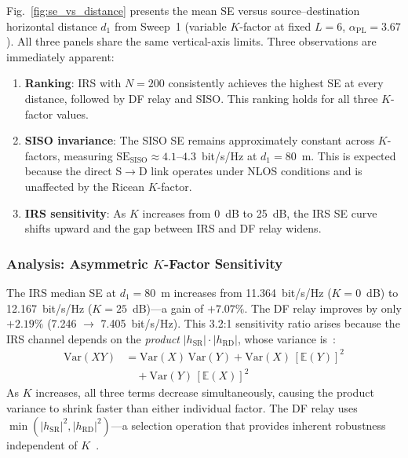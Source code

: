 \documentclass[journal]{IEEEtran} %
\begin{document}
Fig.~\ref{fig:se_vs_distance} presents the mean SE versus source--destination horizontal distance $d_1$ from Sweep~1 (variable $K$-factor at fixed $L = 6$, $\alpha_{\mathrm{PL}} = 3.67$). All three panels share the same vertical-axis limits. Three observations are immediately apparent:

\begin{enumerate}
    \item \textbf{Ranking}: IRS with $N = 200$ consistently achieves the highest SE at every distance, followed by DF relay and SISO. This ranking holds for all three $K$-factor values.

    \item \textbf{SISO invariance}: The SISO SE remains approximately constant across $K$-factors, measuring $\mathrm{SE}_{\mathrm{SISO}} \approx 4.1$--$4.3$~bit/s/Hz at $d_1 = 80$~m. This is expected because the direct S$\to$D link operates under NLOS conditions and is unaffected by the Ricean $K$-factor.

    \item \textbf{IRS sensitivity}: As $K$ increases from 0~dB to 25~dB, the IRS SE curve shifts upward and the gap between IRS and DF relay widens.
\end{enumerate}

\subsubsection{Analysis: Asymmetric $K$-Factor Sensitivity}

The IRS median SE at $d_1 = 80$~m increases from 11.364~bit/s/Hz ($K = 0$~dB) to 12.167~bit/s/Hz ($K = 25$~dB)---a gain of $+7.07\%$. The DF relay improves by only $+2.19\%$ (7.246 $\to$ 7.405~bit/s/Hz). This 3.2:1 sensitivity ratio arises because the IRS channel depends on the \textit{product} $|h_{\mathrm{SR}}| \cdot |h_{\mathrm{RD}}|$, whose variance is~\cite{simon2005digital}:
\begin{align}
    \mathrm{Var}(XY) &= \mathrm{Var}(X)\,\mathrm{Var}(Y) + \mathrm{Var}(X)\,[\mathbb{E}(Y)]^2 \nonumber \\
    &\quad+ \mathrm{Var}(Y)\,[\mathbb{E}(X)]^2
    \label{eq:product_variance}
\end{align}
As $K$ increases, all three terms decrease simultaneously, causing the product variance to shrink faster than either individual factor. The DF relay uses $\min(|h_{\mathrm{SR}}|^2, |h_{\mathrm{RD}}|^2)$---a selection operation that provides inherent robustness independent of $K$~\cite{hasna2003relay,laneman2004cooperative}.
\end{document}
